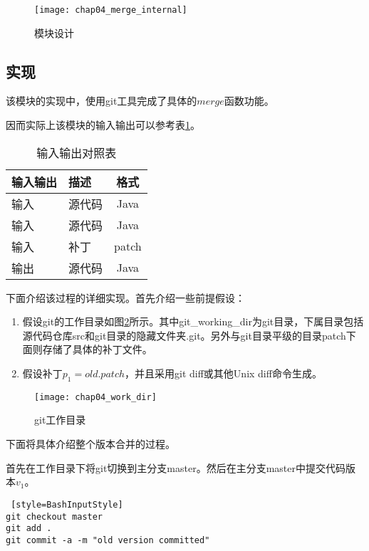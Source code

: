 \begin{figure}[H]
	\centering
	\texttt{[image: chap04\_merge\_internal]}
	\caption {模块设计}
	\label {merge_des}	
\end{figure}

\subsection{实现}

该模块的实现中，使用git工具完成了具体的$merge$函数功能。

因而实际上该模块的输入输出可以参考表\ref {version_io2}。

\begin{table}[H]
	\caption{输入输出对照表}
	\label{version_io2}
	\centering
	\begin{tabular}{llc}
		\toprule[1.5pt]
		{\heiti 输入输出} & {\heiti 描述} & {\heiti 格式}\\\midrule[1pt]
		输入 & 源代码 & Java\\
		输入 & 源代码 & Java\\
		输入 & 补丁 & patch\\
		输出 & 源代码 & Java\\
		\bottomrule[1.5pt]
	\end{tabular}
\end{table}


下面介绍该过程的详细实现。首先介绍一些前提假设：

\begin{enumerate}
	\item 假设git的工作目录如图\ref {git_work_dir}所示。其中git\_working\_dir为git目录，下属目录包括源代码仓库src和git目录的隐藏文件夹.git。另外与git目录平级的目录patch下面则存储了具体的补丁文件。

	\item 假设补丁$p_1 = old.patch$，并且采用git diff或其他Unix diff命令生成。
\end{enumerate}

\begin{figure}[H]
	\centering
	\texttt{[image: chap04\_work\_dir]}
	\caption {git工作目录}
	\label {git_work_dir}	
\end{figure}

下面将具体介绍整个版本合并的过程。


首先在工作目录下将git切换到主分支master。然后在主分支master中提交代码版本$v_1$。

\begin{lstlisting} [style=BashInputStyle]
git checkout master
git add .
git commit -a -m "old version committed"
\end{lstlisting}

